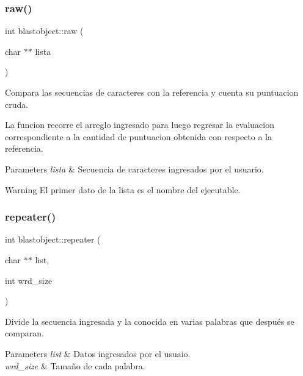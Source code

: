 \subsubsection{raw()}
{\footnotesize\ttfamily int blastobject\+::raw (\begin{DoxyParamCaption}\item[{char $\ast$$\ast$}]{lista }\end{DoxyParamCaption})}



Compara las secuencias de caracteres con la referencia y cuenta su puntuacion cruda. 

La funcion recorre el arreglo ingresado para luego regresar la evaluacion correspondiente a la cantidad de puntuacion obtenida con respecto a la referencia.


\begin{DoxyParams}{Parameters}
{\em lista} & Secuencia de caracteres ingresados por el usuario. \\
\hline
\end{DoxyParams}
\begin{DoxyWarning}{Warning}
El primer dato de la lista es el nombre del ejecutable. 
\end{DoxyWarning}
\label{classblastobject_a21c20ca1d5c6e628a000c66f046e4163} 
\subsubsection{repeater()}
{\footnotesize\ttfamily int blastobject\+::repeater (\begin{DoxyParamCaption}\item[{char $\ast$$\ast$}]{list,  }\item[{int}]{wrd\+\_\+size }\end{DoxyParamCaption})}



Divide la secuencia ingresada y la conocida en varias palabras que después se comparan. 


\begin{DoxyParams}{Parameters}
{\em list} & Datos ingresados por el usuaio. \\
\hline
{\em wrd\+\_\+size} & Tamaño de cada palabra. \\
\hline
\end{DoxyParams}
\label{classblastobject_af1276716ef8334ef5adff67ad1cb8171} 
